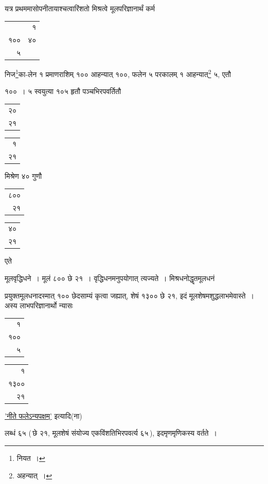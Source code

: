 \documentclass[10pt, openany]{book}
\begin{document}
{{यत्र प्रथममासोपनीतायाश्चत्वारिंशतो मिश्रत्वे मूलपरिज्ञानार्थं कर्म\textendash \,\begin{tabular}{|r|r|} & १\\१०० & ४०\\ ५ & \\ \hline \end{tabular} निज\renewcommand{\thefootnote}{\s १}\footnote{\s नियत~।}का-लेन १ प्रमाणराशिम् १०० आहन्यात् १००, फलेन ५ परकालम् १ आहन्यात्\renewcommand{\thefootnote}{\s २}\footnote{\s अहन्यात्~।}
५, एतौ}
{१००~। ५ स्वयुत्या १०५ हृतौ पञ्चभिरपवर्तितौ \begin{tabular}{r|} २०\\ २१ \end{tabular}\begin{tabular}{r}१ \\ २१\end{tabular}मिश्रेण ४०
गुणौ \begin{tabular}{r|}८०० \\२१\end{tabular}\begin{tabular}{r}  ४० \\२१\end{tabular}एते}
{मूलवृद्धिधने~। मूलं ८०० छे २१~। वृद्धिधनमनुपयोगात् त्यज्यते~।
मिश्रधनोद्धॄतमूलधनं}
{प्रयुक्तमूलधनादस्मात् १०० छेदसाम्यं कृत्वा जह्यात्, शेषं १३०० छे २१,
इदं मूलशेषमशुद्धलाभमेवास्ते~। अस्य लाभपरिज्ञानार्थो न्यासः\textendash \,\begin{tabular}{r|}१\\१०० \\५ \end{tabular}\begin{tabular}{r|}१\\१३०० \\  २१ \end{tabular}
\hyperref[45]{'नीते फलेऽन्यपक्षम्'} इत्यादि(ना)}
{लब्धं ६५ (\,छे २१, मूलशेषं संयोज्य एकविंशतिभिरपवर्त्य ६५\,), इदमृणमृणिकस्य वर्तते~।}\\

}
\end{document}
